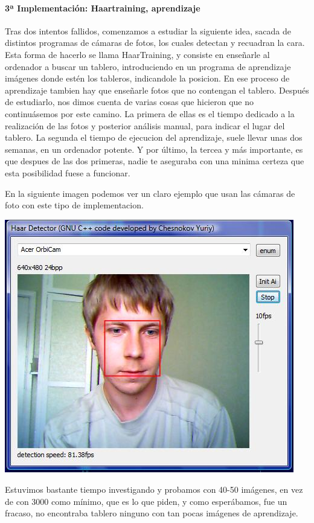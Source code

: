 \documentclass[12pt,a4paper]{report}
\begin{document}
\paragraph{3ª Implementación: Haartraining, aprendizaje}

Tras dos intentos fallidos, comenzamos a estudiar la siguiente idea, sacada de
distintos programas de cámaras de fotos, los cuales detectan y recuadran la
cara. Esta forma de hacerlo se llama HaarTraining, y consiste en enseñarle al
ordenador a buscar un tablero, introduciendo en un programa de aprendizaje
imágenes donde estén los tableros, indicandole la posicion. En ese proceso de
aprendizaje tambien hay que enseñarle fotos que no contengan el tablero.
Después de estudiarlo, nos dimos cuenta de varias cosas que hicieron que no
continuásemos por este camino. La primera de ellas es el tiempo dedicado a la
realización de las fotos y posterior análisis manual, para indicar el lugar del
tablero. La segunda el tiempo de ejecucion del aprendizaje, suele llevar unas
dos semanas, en un ordenador potente. Y por último, la tercea y más importante,
es que despues de las dos primeras, nadie te aseguraba con una minima certeza 
que esta posibilidad fuese a funcionar.

En la siguiente imagen podemos ver un claro ejemplo que usan las cámaras de foto
con este tipo de implementacion.

\includegraphics[scale=1]{haartraining.jpg} 

Estuvimos bastante tiempo investigando y probamos con 40-50 imágenes, en vez de
con 3000 como mínimo, que es lo que piden, y como esperábamos, fue un fracaso,
no encontraba tablero ninguno con tan pocas imágenes de aprendizaje. 
\end{document}
